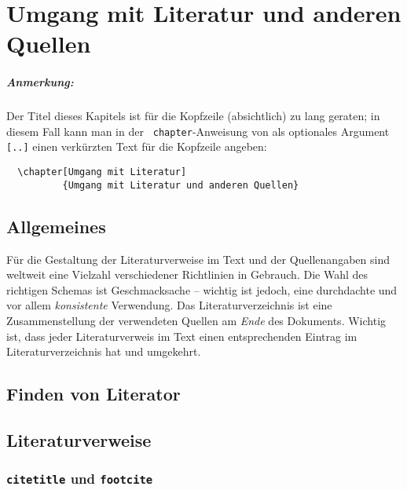 \chapter[Umgang mit Literatur]{Umgang mit Literatur und anderen Quellen}
\label{cha:Literatur}


\paragraph{Anmerkung:}
Der Titel dieses Kapitels ist für die Kopfzeile (absichtlich) zu
lang geraten; in diesem Fall kann man in der {\tt
chapter}-Anweisung von \latex als optionales Argument \verb![..]! einen verkürzten Text für die
Kopfzeile angeben:
\begin{verbatim}
  \chapter[Umgang mit Literatur]
          {Umgang mit Literatur und anderen Quellen}
\end{verbatim}

\section{Allgemeines}

Für die Gestaltung der Literaturverweise im Text und der
Quellenangaben sind weltweit eine Vielzahl verschiedener Richtlinien in
Gebrauch. Die Wahl des richtigen Schemas ist Geschmacksache -- wichtig ist jedoch,
eine durchdachte und vor allem \emph{konsistente} Verwendung.
Das Literaturverzeichnis ist eine
Zusammenstellung der verwendeten Quellen am \emph{Ende} des Dokuments.
Wichtig ist, dass jeder Literaturverweis im Text einen entsprechenden
Eintrag im Literaturverzeichnis hat und umgekehrt.

\section{Finden von Literator}



\section{Literaturverweise}

\subsection{{\tt citetitle} und {\tt footcite}}

